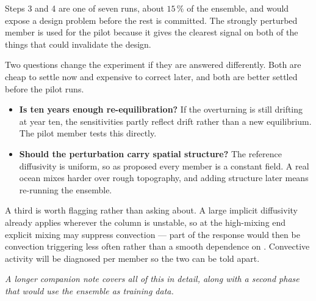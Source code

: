 Steps 3 and 4 are one of seven runs, about $15\,\%$ of the ensemble, and would
expose a design problem before the rest is committed. The strongly perturbed
member is used for the pilot because it gives the clearest signal on both of the
things that could invalidate the design.

Two questions change the experiment if they are answered differently. Both are
cheap to settle now and expensive to correct later, and both are better settled
before the pilot runs.

\begin{itemize}[nosep,leftmargin=1.3em]
  \item \textbf{Is ten years enough re-equilibration?} If the overturning is
        still drifting at year ten, the sensitivities partly reflect drift
        rather than a new equilibrium. The pilot member tests this directly.
  \item \textbf{Should the perturbation carry spatial structure?} The reference
        diffusivity is uniform, so as proposed every member is a constant field.
        A real ocean mixes harder over rough topography, and adding structure
        later means re-running the ensemble.
\end{itemize}
\smallskip

A third is worth flagging rather than asking about. A large implicit diffusivity
already applies wherever the column is unstable, so at the high-mixing end
explicit mixing may suppress convection --- part of the response would then be
convection triggering less often rather than a smooth dependence on \kv.
Convective activity will be diagnosed per member so the two can be told apart.

\smallskip
{\footnotesize\emph{A longer companion note covers all of this in detail, along
with a second phase that would use the ensemble as training data.}}
